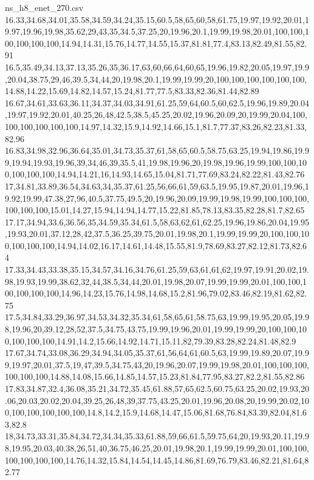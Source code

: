 \begin{filecontents*}[overwrite]{ns_h8_enet_270.csv}
16.33,34.68,34.01,35.58,34.59,34.24,35.15,60.5,58,65,60,58,61.75,19.97,19.92,20.01,19.97,19.96,19.98,35.62,29,43,35,34.5,37.25,20,19.96,20.1,19.99,19.98,20.01,100,100,100,100,100,100,14.94,14.31,15.76,14.77,14.55,15.37,81.81,77.4,83.13,82.49,81.55,82.91
16.5,35.49,34.13,37.13,35.26,35,36.17,63,60,66,64,60,65,19.96,19.82,20.05,19.97,19.9,20.04,38.75,29,46,39.5,34,44,20,19.98,20.1,19.99,19.99,20,100,100,100,100,100,100,14.88,14.22,15.69,14.82,14.57,15.24,81.77,77.5,83.33,82.36,81.44,82.89
16.67,34.61,33.63,36.11,34.37,34.03,34.91,61.25,59,64,60.5,60,62.5,19.96,19.89,20.04,19.97,19.92,20.01,40.25,26,48,42.5,38.5,45.25,20.02,19.96,20.09,20,19.99,20.04,100,100,100,100,100,100,14.97,14.32,15.9,14.92,14.66,15.1,81.7,77.37,83.26,82.23,81.33,82.96
16.83,34.98,32.96,36.64,35.01,34.73,35.37,61,58,65,60.5,58.75,63.25,19.94,19.86,19.99,19.94,19.93,19.96,39,34,46,39,35.5,41,19.98,19.96,20,19.98,19.96,19.99,100,100,100,100,100,100,14.94,14.21,16,14.93,14.65,15.04,81.71,77.69,83.24,82.22,81.43,82.76
17,34.81,33.89,36.54,34.63,34,35.37,61.25,56,66,61,59,63.5,19.95,19.87,20.01,19.96,19.92,19.99,47.38,27,96,40.5,37.75,49.5,20,19.96,20.09,19.99,19.98,19.99,100,100,100,100,100,100,15.01,14.27,15.94,14.94,14.77,15.22,81.85,78.13,83.35,82.28,81.7,82.65
17.17,34.94,33.6,36.56,35,34.59,35.34,61.5,58,63,62,61,62.25,19.96,19.86,20.04,19.95,19.93,20.01,37.12,28,42,37.5,36.25,39.75,20.01,19.98,20.1,19.99,19.99,20,100,100,100,100,100,100,14.94,14.02,16.17,14.61,14.48,15.55,81.9,78.69,83.27,82.12,81.73,82.64
17.33,34.43,33.38,35.15,34.57,34.16,34.76,61.25,59,63,61,61,62,19.97,19.91,20.02,19.98,19.93,19.99,38.62,32,44,38.5,34,44,20.01,19.98,20.07,19.99,19.99,20.01,100,100,100,100,100,100,14.96,14.23,15.76,14.98,14.68,15.2,81.96,79.02,83.46,82.19,81.62,82.75
17.5,34.84,33.29,36.97,34.53,34.32,35.34,61,58,65,61,58.75,63,19.99,19.95,20.05,19.98,19.96,20,39.12,28,52,37.5,34.75,43.75,19.99,19.96,20.01,19.99,19.99,20,100,100,100,100,100,100,14.91,14.2,15.66,14.92,14.71,15.11,82,79.39,83.28,82.24,81.48,82.9
17.67,34.74,33.08,36.29,34.94,34.05,35.37,61,56,64,61,60.5,63,19.99,19.89,20.07,19.99,19.97,20.01,37.5,19,47,39.5,34.75,43,20,19.96,20.07,19.99,19.98,20.01,100,100,100,100,100,100,14.88,14.08,15.66,14.85,14.57,15.23,81.84,77.95,83.27,82.2,81.55,82.86
17.83,34.87,32.4,36.08,35.21,34.72,35.45,61.88,57,65,62.5,60.75,63.25,20.02,19.93,20.06,20.03,20.02,20.04,39.25,26,48,39,37.75,43.25,20.01,19.96,20.08,20,19.99,20.02,100,100,100,100,100,100,14.8,14.2,15.9,14.68,14.47,15.06,81.68,76.84,83.39,82.04,81.63,82.8
18,34.73,33.31,35.84,34.72,34.34,35.33,61.88,59,66,61.5,59.75,64,20,19.93,20.11,19.98,19.95,20.03,40.38,26,51,40,36.75,46.25,20.01,19.98,20.1,19.99,19.99,20.01,100,100,100,100,100,100,14.76,14.32,15.84,14.54,14.45,14.86,81.69,76.79,83.46,82.21,81.64,82.77

\end{filecontents*}
